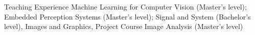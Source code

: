 \begin{rubric}{Teaching Experience}
\entry*[2023 -- Now] Machine Learning for Computer Vision (Master's level); Embedded Perception Systems (Master's level); Signal and System (Bachelor's level), Images and Graphics, Project Course
\entry*[2021 -- 2022] Image Analysis (Master's level)
\end{rubric}